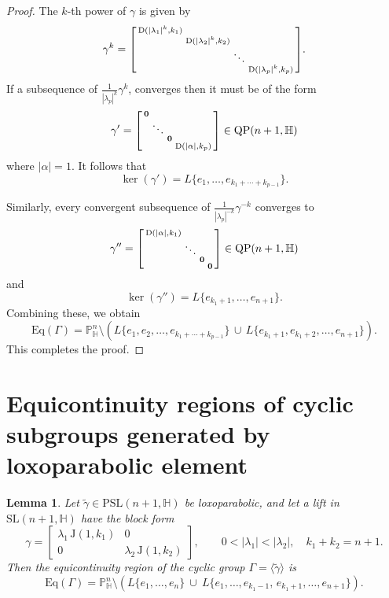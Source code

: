 \documentclass[12pt,reqno]{amsart}
\numberwithin{equation}{section}
\newtheorem{lemma}[theorem]{Lemma}
\theoremstyle{definition}
\def\H{\mathbb H}
\def\P{\mathbb P}
\def\H{\mathbb {H}}
\begin{document}
\begin{proof}
The $k$-th power of $\gamma$ is given by
\[
\gamma^k =
\begin{bsmallmatrix}
    \mathrm{D}(|\lambda_1|^k, k_1) & & & \\
    & \mathrm{D}(|\lambda_2|^k, k_2) & & \\
    & & \ddots & \\
    & & & \mathrm{D}(|\lambda_p|^k, k_p)
\end{bsmallmatrix}.
\]
If a subsequence of $\frac{1}{|\lambda_p|^k}\gamma^k$, converges then it must be of the form
\[
\gamma' =
\begin{bsmallmatrix}
    \mathbf{0} & & & \\
    & \ddots & & \\
    & & \mathbf{0} & \\
    & & & \mathrm{D}(|\alpha|, k_p)
\end{bsmallmatrix}  \in \mathrm{QP}(n+1,\mathbb{H})
\]
where $|\alpha| = 1$. It follows that 
\[
\ker(\gamma') = L\{e_1, \ldots, e_{k_1 + \cdots + k_{p-1}}\}.
\]

Similarly, every convergent subsequence of $\frac{1}{|\lambda_p|^{-k}}\gamma^{-k}$ converges to
\[
\gamma'' =
\begin{bsmallmatrix}
    \mathrm{D}(|\alpha|, k_1) & & & \\
    & \ddots & & \\
    & & \mathbf{0} & \\
    & & & \mathbf{0}
\end{bsmallmatrix}  \in \mathrm{QP}(n+1,\mathbb{H})
\]
and 
\[
\ker(\gamma'') = L\{e_{k_1 + 1}, \ldots, e_{n+1}\}.
\]
Combining these, we obtain
\[
\mathrm{Eq}(\Gamma)
= \P^n_\H\setminus\left(L\{e_1, e_2, \ldots, e_{k_1 + \cdots + k_{p-1}}\}
\, \cup \,
L\{e_{k_1 + 1}, e_{k_1 + 2}, \ldots, e_{n+1}\}\right).
\]
This completes the proof. 
\end{proof}


\section{Equicontinuity regions of cyclic subgroups generated by loxoparabolic element} \label{sec:loxo}
    \begin{lemma}\label{th:loxo1}
Let $\tilde{\gamma}\in \mathrm{PSL}(n+1,\mathbb{H})$ be loxoparabolic, and let a lift in 
$\mathrm{SL}(n+1,\mathbb{H})$ have the block form
$$
\gamma=
\begin{bmatrix}
\lambda_1\,\mathrm{J}(1,k_1) & 0\\[2mm]
0 & \lambda_2\,\mathrm{J}(1,k_2)
\end{bmatrix},
\qquad 0<|\lambda_1|<|\lambda_2|,\quad k_1+k_2=n+1.
$$
Then the equicontinuity region of the cyclic group $\Gamma=\langle\tilde{\gamma}\rangle$ is
$$
\mathrm{Eq}(\Gamma)
=
\P^n_\H\setminus\left({L}\{e_1,\dots,e_n\}
\ \cup\
{L}\{e_1,\dots,e_{k_1-1},\,e_{k_1+1},\dots,e_{n+1}\}\right).
$$
\end{lemma}
\end{document}
